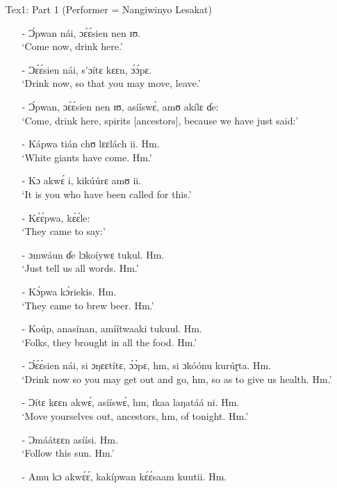 \documentclass[output=paper,colorlinks,citecolor=brown]{langscibook}
\begin{document}
\begin{enumerate}
    \item[]     Tex1: Part 1 (Performer = Nangiwinyo Lesakat)
    \begin{enumerate}
    \item[-]    Ɔ́pwan nái, ɔɛ́ɛ́sien nen ɪʊ.\\
                `Come now, drink here.'
    \item[-]     Ɔɛ́ɛ́sien nái, s’ɔítɛ kɛɛn, ɔ́ɔ́pɛ. \\
                `Drink now, so that you may move, leave.'
    \item[-]     Ɔ́pwan, ɔɛ́ɛ́sien nen ɪʊ, asííswɛ́, amʊ akílɛ ɗe:\\
                `Come, drink here, spirits [ancestors], because we have just said:'
    \item[-]     Kápwa tián chʊ lɛɛlách ii. Hm.\\
                `White giants have come. Hm.' 
    \item[-]     Kɔ akwɛ́ i, kikúúrɛ amʊ ii. \\
                `It is you who have been called for this.'
    \item[-]     Kɛ́ɛ́pwa, kɛ́ɛ́le:\\
                `They came to say:'
    \item[-]     ɔmwáun ɗe lɔkoíywɛ tukul. Hm. \\
                `Just tell us all words. Hm.'
    \item[-]     Kɔ́pwa kɔ́riekis. Hm.\\
                `They came to brew beer. Hm.'
    \item[-]     Koúp, anasínan, amíítwaaki tukuul. Hm. \\
                `Folks, they brought in all the food. Hm.'
    \item[-]     Ɔ́ɛ́ɛ́sien nái, si ɔŋɛɛtítɛ, ɔ́ɔ́pɛ, hm, si ɔkóónu kurúɽta. Hm.\\
                `Drink now so you may get out and go, hm, so as to give us health. Hm.'
    \item[-]     Ɔítɛ kɛɛn akwɛ́, asííswɛ́, hm, ɪkaa laŋatáá ni. Hm. \\
                `Move yourselves out, ancestors, hm, of tonight. Hm.'
    \item[-]     Ɔmáátɛɛn asíísi. Hm.\\
                `Follow this sun. Hm.'
    \item[-]     Amu kɔ akwɛ́ɛ́, kakípwan kɛ́ɛ́saam kuutii. Hm.\\

\end{enumerate}
\end{enumerate}
\end{document}
